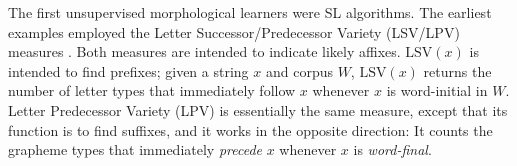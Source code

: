 {The first unsupervised morphological learners were SL algorithms. The earliest examples employed the 
Letter Successor/Predecessor Variety (LSV/LPV) measures \citep{harris:1955, harris:1967}. 
Both measures are intended to indicate likely affixes.
$\text{LSV}(x)$ is intended to find prefixes; given a string $x$ and corpus $W$, 
$\text{LSV}(x)$ returns the number of letter types that immediately follow $x$ whenever $x$ is word-initial in $W$.
Letter Predecessor Variety (LPV) is essentially the same measure, except that its function is to find suffixes,
and it works in the opposite direction:
It counts the grapheme types that immediately \emph{precede} $x$ whenever $x$ is \emph{word-final}.


%

}
